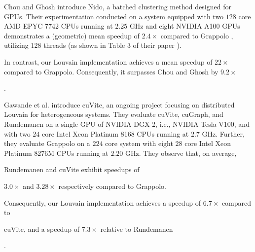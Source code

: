 Chou and Ghosh \cite{chou2022batched} introduce Nido, a batched clustering method designed for GPUs. Their experimentation conducted on a system equipped with two $128$ core AMD EPYC 7742 CPUs running at $2.25$ GHz and eight NVIDIA A100 GPUs demonstrates a (geometric) mean speedup of $2.4\times$ compared to Grappolo \cite{com-halappanavar17}, utilizing $128$ threads (as shown in Table 3 of their paper \cite{chou2022batched}). In contrast, our Louvain implementation achieves a mean speedup of $22\times$ compared to Grappolo. Consequently, it surpasses Chou and Ghosh by $9.2\times$.

Gawande et al. \cite{com-gawande22} introduce cuVite, an ongoing project focusing on distributed Louvain for heterogeneous systems. They evaluate cuVite, cuGraph, and Rundemanen on a single-GPU of NVIDIA DGX-2, i.e., NVIDIA Tesla V100, and with two $24$ core Intel Xeon Platinum 8168 CPUs running at $2.7$ GHz. Further, they evaluate Grappolo on a $224$ core system with eight $28$ core Intel Xeon Platinum 8276M CPUs running at $2.20$ GHz. They observe that, on average, Rundemanen and cuVite exhibit speedups of\ignore{$3.3\times$,} $3.0\times$ and $3.28\times$ respectively compared to Grappolo.  Consequently, our Louvain implementation achieves a speedup of $6.7\times$ compared to cuVite, and a speedup of $7.3\times$ relative to Rundemanen.

